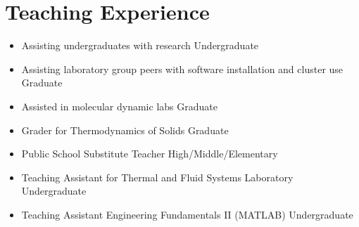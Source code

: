 \section{Teaching Experience}

\begin{itemize}
    \item Assisting undergraduates with research \hfill Undergraduate
    \item Assisting laboratory group peers with software installation and cluster use \hfill Graduate
    \item Assisted in molecular dynamic labs \hfill Graduate
    \item Grader for Thermodynamics of Solids \hfill Graduate
    \item Public School Substitute Teacher \hfill High/Middle/Elementary
    \item Teaching Assistant for Thermal and Fluid Systems Laboratory \hfill Undergraduate
    \item Teaching Assistant Engineering Fundamentals II (MATLAB) \hfill Undergraduate
\end{itemize}
